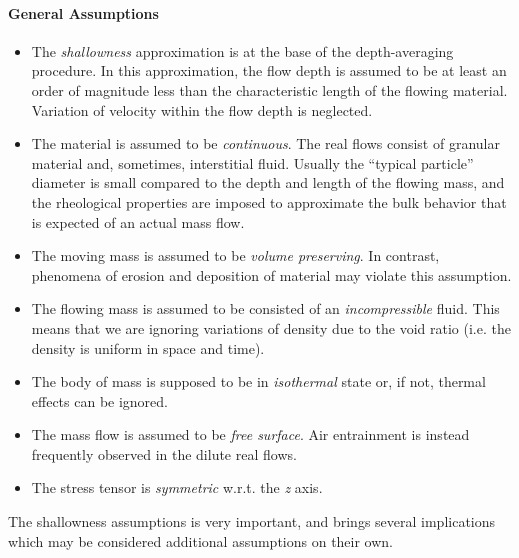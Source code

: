 \documentclass{article}
\begin{document}
\paragraph{General Assumptions}
\begin{itemize}
\item The \textit{shallowness} approximation is at the base of the depth-averaging procedure. In this approximation, the flow depth is assumed to be at least an order of magnitude less than the characteristic length of the flowing material. Variation of velocity within the flow depth is neglected.

\item The material is assumed to be \textit{continuous}. The real flows consist of granular material and, sometimes, interstitial fluid. Usually the ``typical particle'' diameter is small compared to the depth and length of the flowing mass, and the rheological properties are imposed to approximate the bulk behavior that is expected of an actual mass flow.

\item The moving mass is assumed to be \textit{volume preserving}. In contrast, phenomena of erosion and deposition of material may violate this assumption.

\item The flowing mass is assumed to be consisted of an \textit{incompressible} fluid. This means that we are ignoring variations of density due to the void ratio (i.e. the density is uniform in space and time).

\item The body of mass is supposed to be in \textit{isothermal} state or, if not, thermal effects can be ignored.

\item The mass flow is assumed to be \textit{free surface}. Air entrainment is instead frequently observed in the dilute real flows.

\item The stress tensor is \textit{symmetric} w.r.t. the \textit{z} axis.
\end{itemize}

The shallowness assumptions is very important, and brings several implications which may be considered additional assumptions on their own.
\end{document}
